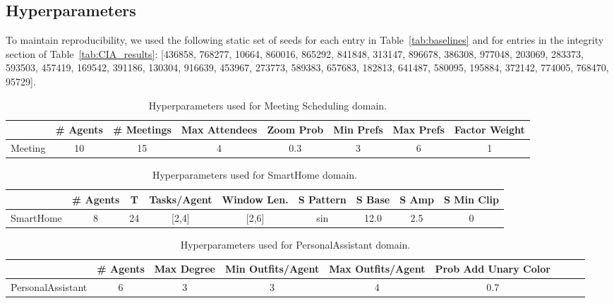 \subsection{Hyperparameters}
To maintain reproducibility, we used the following static set of seeds for each entry in Table~\ref{tab:baselines} and for entries in the integrity section of Table~\ref{tab:CIA_results}: [436858, 768277, 10664, 860016, 865292, 841848, 313147, 896678, 386308, 977048, 203069, 283373, 593503, 457419, 169542, 391186, 130304, 916639, 453967, 273773, 589383, 657683, 182813, 641487, 580095, 195884, 372142, 774005, 768470, 95729].
\begin{table}[!h]
  \centering
  \small
  \setlength\tabcolsep{6pt}
  \renewcommand{\arraystretch}{1.0}
  \begin{tabular}{@{}lccccccc@{}}
    \toprule
     &
    \# Agents &
    \# Meetings &
    Max Attendees &
    Zoom Prob &
    Min Prefs &
    Max Prefs &
    Factor Weight \\
    \midrule
    Meeting
      & 10
      & 15
      & 4
      & 0.3
      & 3
      & 6
      & 1 \\
    \bottomrule
  \end{tabular}
  \caption{Hyperparameters used for Meeting Scheduling domain.}
  \label{tab:hyperparam-meeting}
\end{table}
\begin{table}[!h]
  \centering
  \small
  \setlength\tabcolsep{6pt}
  \renewcommand{\arraystretch}{1.0}
  \begin{tabular}{@{}lcccccccc@{}}
    \toprule
     &
    \# Agents &
    T &
    Tasks\slash Agent &
    Window Len. &
    S Pattern &
    S Base &
    S Amp &
    S Min Clip \\
    \midrule
    SmartHome
      & 8
      & 24
      & [2,4]
      & [2,6]
      & sin
      & 12.0
      & 2.5
      & 0 \\
    \bottomrule
  \end{tabular}
  \caption{Hyperparameters used for SmartHome domain.}
  \label{tab:hyperparam-smarthome}
\end{table}
\begin{table}[!h]
  \centering
  \small
  \setlength\tabcolsep{6pt}
  \renewcommand{\arraystretch}{1.0}
  \begin{tabular}{@{}lcccccccc@{}}
    \toprule
     &
    \# Agents &
    Max Degree &
    Min Outfits\slash Agent &
    Max Outfits\slash Agent &
    Prob Add Unary Color \\
    \midrule
    PersonalAssistant
      & 6
      & 3
      & 3
      & 4
      & 0.7 \\
    \bottomrule
  \end{tabular}
  \caption{Hyperparameters used for PersonalAssistant domain.}
  \label{tab:hyperparam-personal}
\end{table}